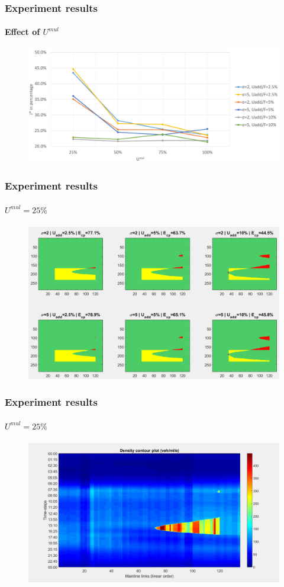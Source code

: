 \documentclass[fleqn]{beamer}
\begin{document}
\begin{frame}
	\frametitle{Experiment results}
	\framesubtitle{Effect of $U^{mul}$}
	\begin{figure}
		\centering
		\includegraphics[width=4.5in]{figures/umul.png}
	\end{figure}
\end{frame}

\begin{frame}
	\frametitle{Experiment results}
	\framesubtitle{$U^{mul}=25\% $}
	\begin{figure}
		\centering
		\includegraphics[width=4.5in]{figures/results_figures/Umul/cp_Umul_25_lambda_11.png}
	\end{figure}
\end{frame}

\begin{frame}
	\frametitle{Experiment results}
	\framesubtitle{$U^{mul}=25\% $}
	\begin{figure}
		\centering
		\includegraphics[width=4.5in]{figures/results_figures/Umul/13_2_too_tight_contour.png}
	\end{figure}
\end{frame}
\end{document}
